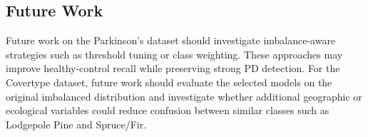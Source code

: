 \documentclass[11pt,a4paper]{article}
\begin{document}
\subsection{Future Work}

Future work on the Parkinson's dataset should investigate imbalance-aware
strategies such as threshold tuning or class weighting. These approaches
may improve healthy-control recall while preserving strong PD detection.
For the Covertype dataset, future work should evaluate the selected models
on the original imbalanced distribution and investigate whether additional
geographic or ecological variables could reduce confusion between similar
classes such as Lodgepole Pine and Spruce/Fir.
\end{document}
